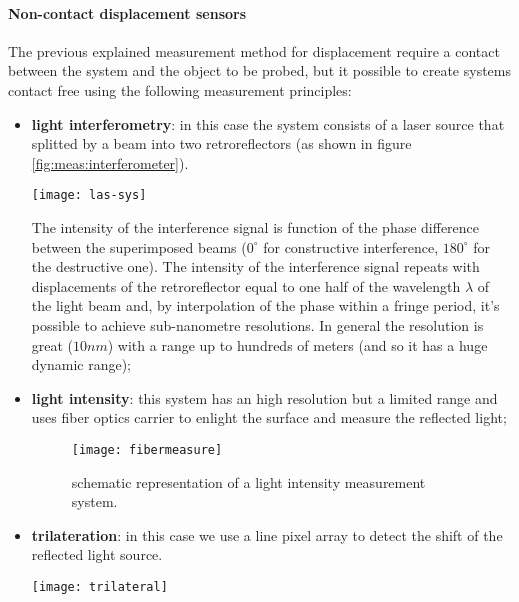 	\paragraph{Non-contact displacement sensors} The previous explained measurement method for displacement require a contact between the system and the object to be probed, but it possible to create systems contact free using the following measurement principles:
	\begin{itemize}
		\item \textbf{light interferometry}: in this case the system  consists of a laser source that splitted by a beam into two retroreflectors (as shown in figure \ref{fig:meas:interferometer}).		
		
		\begin{SCfigure}[1][bht]
			\centering \texttt{[image: las-sys]}
			\caption{schematic representation of a laser interferometer.} \label{fig:meas:interferometer}
		\end{SCfigure}
		 
		 The intensity of the interference signal is function of the phase difference between the superimposed beams ($0^\circ$ for constructive interference, $180^\circ$ for the destructive one). The intensity of the interference signal repeats with displacements of the retroreflector equal to one half of the wavelength $\lambda$ of the light beam and, by interpolation of the phase within a fringe period, it's possible to achieve sub-nanometre resolutions. In general the resolution is great ($10nm$) with a range up to hundreds of meters (and so it has a huge dynamic range);
		 
		 \item \textbf{light intensity}: this system has an high resolution but a limited range  and uses fiber optics carrier to enlight the surface and measure the reflected light;
		 \begin{figure}[bht]
		 	\centering \texttt{[image: fibermeasure]}
		 	\caption{schematic representation of a light intensity measurement system.}
		 \end{figure}
	 
	 	\item \textbf{trilateration}: in this case we use a line pixel array to detect the shift of the reflected light source.
	 	
	 	\begin{SCfigure}[1][bht]
	 		\centering \texttt{[image: trilateral]}
	 		\caption{schematic representation of a trilateration measurement system.}
	 	\end{SCfigure}		
	\end{itemize}
	
